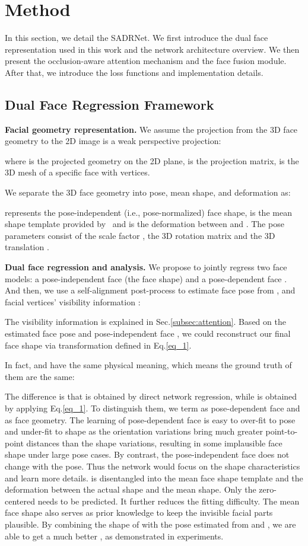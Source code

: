 \documentclass[journal]{IEEEtran}
\begin{document}
	\section{Method}
	In this section, we detail the SADRNet. We first introduce the dual face representation used in this work and the network architecture overview. We then present the occlusion-aware attention mechanism and the face fusion module. After that, we introduce the loss functions and implementation details.
	\subsection{Dual Face Regression Framework}
	\label{sec:framework}
	
	
	{\bf Facial geometry representation.}
	We assume the projection from the 3D face geometry to the 2D image is a weak perspective projection:
	
	
	where  is the projected geometry on the 2D plane,  is the projection matrix,  is the 3D mesh of a specific face with  vertices.
	
	We separate the 3D face geometry into pose, mean shape, and deformation as:
	
	
	 represents the pose-independent (i.e., pose-normalized) face shape,
	 is the mean shape template provided by~\cite{BFM2009} and  is the deformation between  and .
	The pose parameters consist of the scale factor , the 3D rotation matrix  and the 3D translation .


	{\bf Dual face regression and analysis.}
	We propose to jointly regress two face models: a pose-independent face (the face shape)  and a pose-dependent face . And then, we use a self-alignment post-process  to estimate face pose from ,  and facial vertices' visibility information :
	
	The visibility information  is explained in Sec.\ref{subsec:attention}. Based on the estimated face pose  and pose-independent face , we could reconstruct our final face shape  via transformation defined in Eq.\ref{eq_1}.
	
	In fact,  and  have the same physical meaning, which means the ground truth of them are the same:
	
	The difference is that  is obtained by direct network regression, while  is obtained by applying Eq.\ref{eq_1}. To distinguish them, we term  as pose-dependent face and  as face geometry.
	The learning of pose-dependent face is easy to over-fit to pose and under-fit to shape as the orientation variations bring much greater point-to-point distances than the shape variations, resulting in some implausible face shape under large pose cases. By contrast, the pose-independent face  does not change with the pose. Thus the network would focus on the shape characteristics and learn more details.   is disentangled into the mean face shape template  and the deformation  between the actual shape and the mean shape. Only the zero-centered  needs to be predicted. It further reduces the fitting difficulty. The mean face shape also serves as prior knowledge to keep the invisible facial parts plausible. By combining the shape of  with the pose  estimated from  and , we are able to get a much better , as demonstrated in experiments.
	
\end{document}
